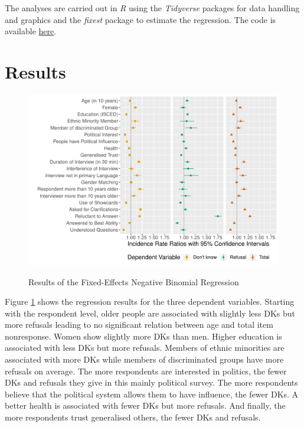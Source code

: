 \documentclass[a4paper,12pt]{article}
\begin{document}
The analyses are carried out in \textit{R} \citep{rcoreteamLanguageEnvironmentStatistical2021} using the \textit{Tidyverse} packages \citep{wickhamWelcomeTidyverse2019} for data handling and graphics and the \textit{fixest} package \citep{bergeEfficientEstimationMaximum2018} to estimate the regression. The code is available \href{https://github.com/maltegroenemann/inr_ess9}{here}.


\section{Results}

\begin{figure}
\caption{Results of the Fixed-Effects Negative Binomial Regression}
 \includegraphics[width=.99\textwidth]{results.pdf}
 \label{results}
\end{figure}


Figure \ref{results} shows the regression results for the three dependent variables. Starting with the respondent level, older people are associated with slightly less DKs but more refusals leading to no significant relation between age and total item nonresponse. Women show slightly more DKs than men. Higher education is associated with less DKs but more refusals. Members of ethnic minorities are associated with more DKs while members of discriminated groups have more refusals on average. The more respondents are interested in politics, the fewer DKs and refusals they give in this mainly political survey. The more respondents believe that the political system allows them to have influence, the fewer DKs. A better health is associated with fewer DKs but more refusals. And finally, the more respondents trust generalised others, the fewer DKs and refusals.
\end{document}
